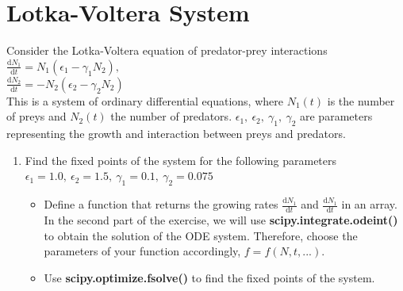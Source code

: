 \documentclass[smallheadings,12pt]{scrartcl}
\begin{document}
\section{Lotka-Voltera System}
Consider the Lotka-Voltera equation of predator-prey interactions\\[0.5em]
$\frac{\mathrm{d}N_1}{\mathrm{d}t} = N_1(\epsilon_1 - \gamma_1 N_2),$\\
$\frac{\mathrm{d}N_2}{\mathrm{d}t} = -N_2(\epsilon_2 - \gamma_2 N_2)$\\[0.5em]
This is a system of ordinary differential equations, where $N_1(t)$ is the number of preys and $N_2(t)$ the number of predators.
$\epsilon_1,\:\epsilon_2,\:\gamma_1,\:\gamma_2$ are parameters representing the growth and interaction between preys and predators.
\begin{enumerate}
  \item Find the fixed points of the system for the following parameters\\
$\epsilon_1 = 1.0,\:\epsilon_2 = 1.5,\:\gamma_1 = 0.1,\:\gamma_2 = 0.075$
    \begin{itemize}
      \item Define a function that returns the growing rates $\frac{\mathrm{d}N_1}{\mathrm{d}t}$ and $\frac{\mathrm{d}N_1}{\mathrm{d}t}$ in an array. In the second part of the exercise, we will use \textbf{scipy.integrate.odeint()} to obtain the solution of the ODE system. Therefore,  choose the parameters of your function accordingly, $f = f(N, t, ...)$.
      \item Use \textbf{scipy.optimize.fsolve()} to find the fixed points of the system.
    \end{itemize}


\end{enumerate}
\end{document}
